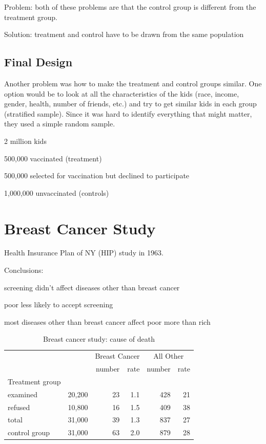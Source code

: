 \documentclass[landscape]{exam}
\begin{document}
  Problem: both of these problems are that the control group is different from the
  treatment group.

  Solution: treatment and control have to be drawn from the same population

  \subsection{Final Design}
  Another problem was how to make the treatment and control groups similar.  One
  option would be to look at all the characteristics of the kids (race, income,
  gender, health, number of friends, etc.) and try to get similar kids in each
  group (stratified sample).  Since it was hard to identify everything that
  might matter, they used a simple random sample.

  \begin{itemize*}
    \item 2 million kids
    \item 500,000 vaccinated (treatment)
    \item 500,000 selected for vaccination but declined to participate
    \item 1,000,000 unvaccinated (controls)
  \end{itemize*}

  \section{Breast Cancer Study}
  Health Insurance Plan of NY (HIP) study in 1963.

  Conclusions:
  \begin{itemize*}
    \item screening didn't affect diseases other than breast cancer
    \item poor less likely to accept screening
    \item most diseases other than breast cancer affect poor more than rich
  \end{itemize*}

  \begin{table}
    \centering
    \begin{tabular}{lrrrrr}
      & & \multicolumn{2}{c}{Breast Cancer} & \multicolumn{2}{c}{All Other} \\
                               \cmidrule(r){3-4} \cmidrule(r){5-6}    
                      &        & number & rate & number & rate \\
      Treatment group \\
      examined        & 20,200 & 23     & 1.1  & 428    & 21 \\
      refused         & 10,800 & 16     & 1.5  & 409    & 38 \\
      total           & 31,000 & 39     & 1.3  & 837    & 27 \\
    \midrule
      control group   & 31,000 & 63     & 2.0  & 879    & 28 \\
    \end{tabular}
    \caption{Breast cancer study: cause of death}
    \label{tab:breast.cancer}
  \end{table}
\end{document}
